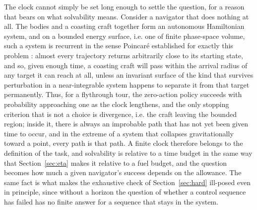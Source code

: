 \documentclass[11pt]{article}
\begin{document}
The clock cannot simply be set long enough to settle the question, for a
reason that bears on what solvability means. Consider a navigator that does nothing at all. The bodies and a coasting
craft together form an autonomous Hamiltonian system, and on a bounded
energy surface, i.e. one of finite phase-space volume, such a system is
recurrent in the sense Poincar\'e established for exactly this problem
\cite{poincare1890}: almost every trajectory returns arbitrarily close to
its starting state, and so, given enough time, a coasting craft will pass
within the arrival radius of any target it can reach at all, unless an
invariant surface of the kind that survives perturbation in a near-integrable
system \cite{kolmogorov1954,arnold1963} happens to separate it from that
target permanently. Thus, for a flythrough tour, the zero-action policy
succeeds with probability approaching one as the clock lengthens, and the
only stopping criterion that is not a choice is divergence, i.e. the craft
leaving the bounded region; inside it, there is always an improbable path
that has not yet been given time to occur, and in the extreme of a system
that collapses gravitationally toward a point, every path is that path. A
finite clock therefore belongs to the definition of the task, and
solvability is relative to a time budget in the same way that
Section~\ref{sec:eta} makes it relative to a fuel budget, and the question
becomes how much a given navigator's success depends on the allowance. The
same fact is what makes the exhaustive check of Section~\ref{sec:hard}
ill-posed even in principle, since without a horizon the question of whether
a control sequence has failed has no finite answer for a sequence that stays
in the system.
\end{document}
